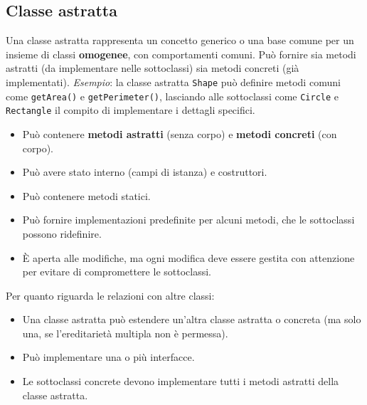 \begin{solution}
\section*{Classe astratta}
Una classe astratta rappresenta un concetto generico o una base comune per un insieme di classi \textbf{omogenee},
con comportamenti comuni. Può fornire sia metodi astratti (da implementare nelle sottoclassi) sia metodi concreti (già implementati).
\newline
\textit{Esempio}: la classe astratta \texttt{Shape} può definire metodi comuni come \texttt{getArea()} e
\texttt{getPerimeter()}, lasciando alle sottoclassi come \texttt{Circle} e \texttt{Rectangle} il compito di 
implementare i dettagli specifici.
\newline
\begin{itemize}
	\item Può contenere \textbf{metodi astratti} (senza corpo) e \textbf{metodi concreti} (con corpo).
	\item Può avere stato interno (campi di istanza) e costruttori.
	\item Può contenere metodi statici.
	\item Può fornire implementazioni predefinite per alcuni metodi, che le sottoclassi possono ridefinire.
	\item È aperta alle modifiche, ma ogni modifica deve essere gestita con attenzione per evitare di compromettere le sottoclassi.
\end{itemize}
Per quanto riguarda le relazioni con altre classi:
\begin{itemize}
	\item Una classe astratta può estendere un'altra classe astratta o concreta (ma solo una, se l'ereditarietà multipla non è permessa).
	\item Può implementare una o più interfacce.
	\item Le sottoclassi concrete devono implementare tutti i metodi astratti della classe astratta.
\end{itemize}
\end{solution}

